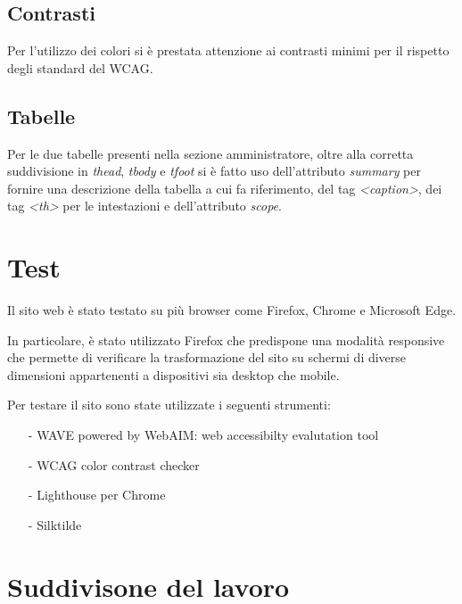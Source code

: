 \documentclass[a4paper]{article}
\begin{document}
\subsection{Contrasti}

Per l'utilizzo dei colori si è prestata attenzione ai contrasti minimi per il rispetto degli standard del WCAG.

\subsection{Tabelle}
Per le due tabelle presenti nella sezione amministratore, oltre alla corretta suddivisione in \textit{thead}, \textit{tbody} e \textit{tfoot} si è fatto uso dell'attributo \textit{summary} per fornire una descrizione della tabella a cui fa riferimento, del tag \textit{<caption>}, dei tag \textit{<th>} per le intestazioni e dell'attributo \textit{scope}.

\section{Test}

Il sito web è stato testato su più browser come Firefox, Chrome e Microsoft Edge. 

In particolare, è stato utilizzato Firefox che predispone una modalità responsive che permette di verificare la trasformazione del sito su schermi di diverse dimensioni appartenenti a dispositivi sia desktop che mobile.

Per testare il sito sono state utilizzate i seguenti strumenti:
\begin{itemize}
    \item [-] WAVE powered by WebAIM: web accessibilty evalutation tool
    \item [-] WCAG color contrast checker
    \item [-] Lighthouse per Chrome
    \item [-] Silktilde
\end{itemize}


\section{Suddivisone del lavoro}
\end{document}
